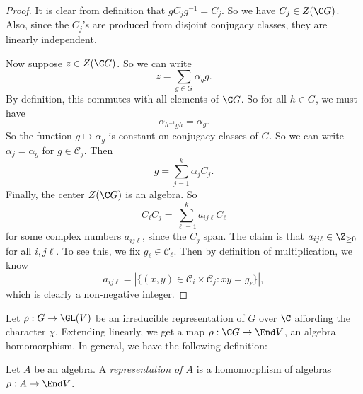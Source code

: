 \documentclass[a4paper]{article}
\begin{document}
\begin{proof}
  It is clear from definition that $g C_j g^{-1} = C_j$. So we have $C_j \in Z(\C G)$. Also, since the $C_j$'s are produced from disjoint conjugacy classes, they are linearly independent.

  Now suppose $z \in Z(\C G)$. So we can write
  \[
    z = \sum_{g \in G} \alpha_g g.
  \]
  By definition, this commutes with all elements of $\C G$. So for all $h \in G$, we must have
  \[
    \alpha_{h^{-1}gh} = \alpha_g.
  \]
  So the function $g \mapsto \alpha_g$ is constant on conjugacy classes of $G$. So we can write $\alpha_j = \alpha_g$ for $g \in \mathcal{C}_j$. Then
  \[
    g = \sum_{j = 1}^k \alpha_j C_j.
  \]
  Finally, the center $Z(\C G)$ is an algebra. So
  \[
    C_i C_j = \sum_{\ell = 1}^k a_{ij\ell} C_\ell
  \]
  for some complex numbers $a_{ij\ell}$, since the $C_j$ span. The claim is that $a_{ij\ell} \in \Z_{\geq 0}$ for all $i, j \ell$. To see this, we fix $g_\ell \in \mathcal{C}_\ell$. Then by definition of multiplication, we know
  \[
    a_{ij\ell} = |\{(x, y) \in \mathcal{C}_i\times \mathcal{C}_j: xy = g_\ell\}|,
  \]
  which is clearly a non-negative integer.
\end{proof}

Let $\rho: G \to \GL(V)$ be an irreducible representation of $G$ over $\C$ affording the character $\chi$. Extending linearly, we get a map $\rho: \C G \to \End V$, an algebra homomorphism. In general, we have the following definition:
\begin{defi}
  Let $A$ be an algebra. A \emph{representation of $A$} is a homomorphism of algebras $\rho: A \to \End V$.
\end{defi}
\end{document}
